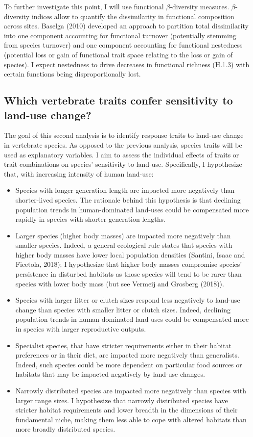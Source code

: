 To further investigate this point, I will use functional $\beta$-diversity measures. $\beta$-diversity indices allow to quantify the dissimilarity in functional composition across sites. Baselga (2010) developed an approach to partition total dissimilarity into one component accounting for functional turnover (potentially stemming from species turnover) and one component accounting for functional nestedness (potential loss or gain of functional trait space relating to the loss or gain of species). I expect nestedness to drive decreases in functional richness (H.1.3) with certain functions being disproportionally lost.


\subsection{Which vertebrate traits confer sensitivity to land-use change?}
The goal of this second analysis is to identify response traits to land-use change in vertebrate species. As opposed to the previous analysis, species traits will be used as explanatory variables. I aim to assess the individual effects of traits or trait combinations on species’ sensitivity to land-use. Specifically, I hypothesize that, with increasing intensity of human land-use:
\begin{itemize}
\item Species with longer generation length are impacted more negatively than shorter-lived species. The rationale behind this hypothesis is that declining population trends in human-dominated land-uses could be compensated more rapidly in species with shorter generation lengths.
\item Larger species (higher body masses) are impacted more negatively than smaller species. Indeed, a general ecological rule states that species with higher body masses have lower local population densities (Santini, Isaac and Ficetola, 2018); I hypothesize that higher body masses compromise species’ persistence in disturbed habitats as those species will tend to be rarer  than species with lower body mass (but see Vermeij and Grosberg (2018)).
\item Species with larger litter or clutch sizes respond less negatively to land-use change than species with smaller litter or clutch sizes. Indeed, declining population trends in human-dominated land-uses could be compensated more in species with larger reproductive outputs.
\item Specialist species, that have stricter requirements either in their habitat preferences or in their diet, are impacted more negatively than generalists. Indeed, such species could be more dependent on particular food sources or habitats that may be impacted negatively by land-use changes.
\item Narrowly distributed species are impacted more negatively than species with larger range sizes. I hypothesize that narrowly distributed species have stricter habitat requirements and lower breadth in the dimensions of their fundamental niche, making them less able to cope with altered habitats than more broadly distributed species.
\end{itemize}